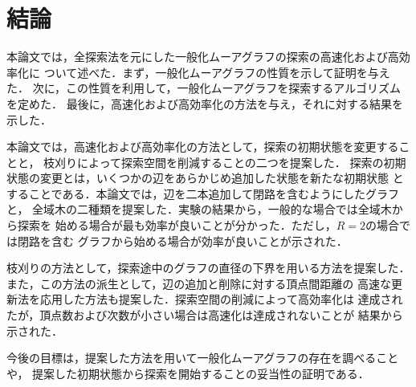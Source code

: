 
\chapter{結論}
本論文では，全探索法を元にした一般化ムーアグラフの探索の高速化および高効率化に
ついて述べた．まず，一般化ムーアグラフの性質を示して証明を与えた．
次に，この性質を利用して，一般化ムーアグラフを探索するアルゴリズムを定めた．
最後に，高速化および高効率化の方法を与え，それに対する結果を示した．

本論文では，高速化および高効率化の方法として，探索の初期状態を変更することと，
枝刈りによって探索空間を削減することの二つを提案した．
探索の初期状態の変更とは，いくつかの辺をあらかじめ追加した状態を新たな初期状態
とすることである．本論文では，辺を二本追加して閉路を含むようにしたグラフと，
全域木の二種類を提案した．実験の結果から，一般的な場合では全域木から探索を
始める場合が最も効率が良いことが分かった．ただし，$R=2$の場合では閉路を含む
グラフから始める場合が効率が良いことが示された．

枝刈りの方法として，探索途中のグラフの直径の下界を用いる方法を提案した．
また，この方法の派生として，辺の追加と削除に対する頂点間距離の
高速な更新法を応用した方法も提案した．探索空間の削減によって高効率化は
達成されたが，頂点数および次数が小さい場合は高速化は達成されないことが
結果から示された．

今後の目標は，提案した方法を用いて一般化ムーアグラフの存在を調べることや，
提案した初期状態から探索を開始することの妥当性の証明である．

